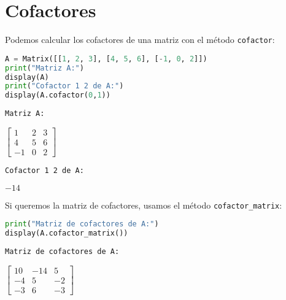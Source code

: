 \documentclass[a4,11pt]{aleph-notas}
\begin{document}
\encabezado

\vspace*{-10mm}
\section{Cofactores}

Podemos calcular los cofactores de una matriz con el método \texttt{cofactor}:

\begin{pycodigo}
    \begin{ipynbcodigo}\begin{lstlisting}[language=Python]
A = Matrix([[1, 2, 3], [4, 5, 6], [-1, 0, 2]])
print("Matriz A:")
display(A)
print("Cofactor 1 2 de A:")
display(A.cofactor(0,1))
    \end{lstlisting}\end{ipynbcodigo}
    \begin{ipynbsalida}
    \begin{Verbatim}[commandchars=\\\{\}]
Matriz A:
    \end{Verbatim}

    $\displaystyle \left[\begin{matrix}1 & 2 & 3\\4 & 5 & 6\\-1 & 0 & 2\end{matrix}\right]$

    
    \begin{Verbatim}[commandchars=\\\{\}]
Cofactor 1 2 de A:
    \end{Verbatim}

    $\displaystyle -14$
    \end{ipynbsalida}
\end{pycodigo}
    
Si queremos la matriz de cofactores, usamos el método \texttt{cofactor\_matrix}:
\begin{pycodigo}
    \begin{ipynbcodigo}\begin{lstlisting}[language=Python]
print("Matriz de cofactores de A:")
display(A.cofactor_matrix())
    \end{lstlisting}\end{ipynbcodigo}
    \begin{ipynbsalida}
    \begin{Verbatim}[commandchars=\\\{\}]
Matriz de cofactores de A:
    \end{Verbatim}

    $\displaystyle \left[\begin{matrix}10 & -14 & 5\\-4 & 5 & -2\\-3 & 6 & -3\end{matrix}\right]$
    \end{ipynbsalida}
\end{pycodigo}
\end{document}
